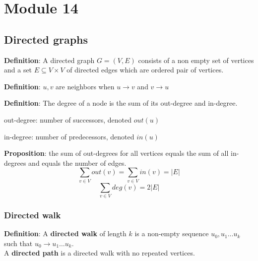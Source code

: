 \chapter{Module 14}

\section{Directed graphs}

\begin{framed}
   \textbf{Definition}: A directed graph $G = (V, E)$ consists of a non empty set of vertices and a set $E \subseteq V \times V$ of directed edges which are ordered pair of vertices. 
\end{framed}

\begin{framed}
   \textbf{Definition}: $u, v$ are neighbors when $u \rightarrow v$ and $v \rightarrow u$ 
\end{framed}

\begin{framed}
   \textbf{Definition}: The degree of a node is the sum of its out-degree and in-degree.
   \begin{framed}
      \item out-degree: number of successors, denoted $out(u)$
      \item in-degree: number of predecessors, denoted $in(u)$
   \end{framed}
\end{framed}

\begin{framed}
   \textbf{Proposition}: the sum of out-degrees for all vertices equals the sum of all in-degrees and equals the number of edges. 
   \[
      \sum_{v \in V} out(v) = \sum_{v \in V} in(v) = |E|
   \] 
   \[
      \sum_{v \in V} deg(v) = 2 |E|
   \] 
\end{framed}

\subsection{Directed walk}
\begin{framed}
   \textbf{Definition}: A \textbf{directed walk} of length $k$ is a non-empty sequence $u_0, u_1 \hdots u_k$ such that $u_0 \rightarrow u_1 \hdots u_k$. \\

   A \textbf{directed path} is a directed walk with no repeated vertices. 
\end{framed}


